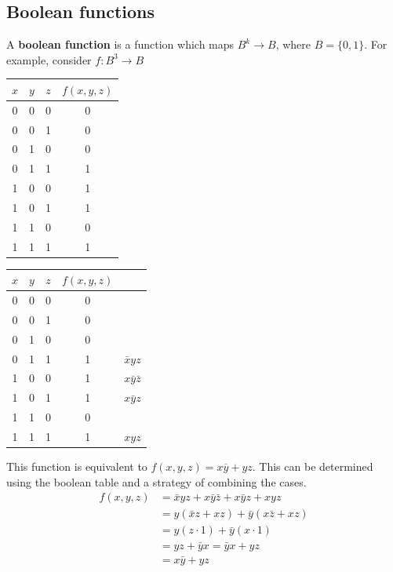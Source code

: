\subsection{Boolean functions}

A \textbf{boolean function} is a function which maps $B^k \rightarrow B$,
where $B = \{0,1\}$. For example, consider $f:B^3 \rightarrow B$

\begin{center}
  \begin{tabular}{ccc|c}
    $x$ & $y$ & $z$ & $f(x, y, z)$ \\
    \hline
    0   & 0   & 0   & 0            \\
    0   & 0   & 1   & 0            \\
    0   & 1   & 0   & 0            \\
    0   & 1   & 1   & 1            \\
    1   & 0   & 0   & 1            \\
    1   & 0   & 1   & 1            \\
    1   & 1   & 0   & 0            \\
    1   & 1   & 1   & 1
  \end{tabular}
  \qquad
  \begin{tabular}{ccc|cc}
    $x$ & $y$ & $z$ & $f(x, y, z)$                     \\
    \hline
    0   & 0   & 0   & 0            &                   \\
    0   & 0   & 1   & 0            &                   \\
    0   & 1   & 0   & 0            &                   \\
    0   & 1   & 1   & 1            & $\bar{x}yz$       \\
    1   & 0   & 0   & 1            & $x\bar{y}\bar{z}$ \\
    1   & 0   & 1   & 1            & $x\bar{y}z$       \\
    1   & 1   & 0   & 0            &                   \\
    1   & 1   & 1   & 1            & $xyz$
  \end{tabular}
\end{center}
This function is equivalent to $f(x,y,z) = x \overline{y} + yz$.
This can be determined using the boolean table and a strategy of combining the cases.
\begin{align*}
  f(x,y,z) & = \bar{x}yz + x\bar{y}\bar{z} + x\bar{y}z + xyz \\
           & = y(\bar{x}z + xz) + \bar{y}(x\bar{z} + xz)     \\
           & = y(z \cdot 1) + \bar{y}(x \cdot 1)             \\
           & = yz + \bar{y}x = \bar{y}x + yz                 \\
           & = x\bar{y} + yz
\end{align*}

